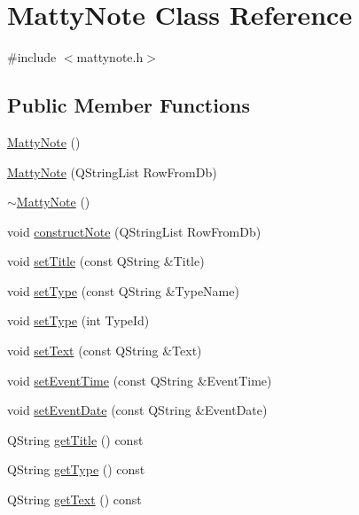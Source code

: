 \hypertarget{classMattyNote}{}\section{Matty\+Note Class Reference}
\label{classMattyNote}


{\ttfamily \#include $<$mattynote.\+h$>$}

\subsection*{Public Member Functions}
\begin{DoxyCompactItemize}
\item 
\hyperlink{classMattyNote_a8c09bf366e6973bc1c4f4d5daa792899}{Matty\+Note} ()
\item 
\hyperlink{classMattyNote_a101e9c2475ee2567dfa2e168b543806f}{Matty\+Note} (Q\+String\+List Row\+From\+Db)
\item 
\hyperlink{classMattyNote_a2831641523b4a0d5c36100689f95c912}{$\sim$\+Matty\+Note} ()
\item 
void \hyperlink{classMattyNote_a180cda16bc8c77964169edb90468c151}{construct\+Note} (Q\+String\+List Row\+From\+Db)
\item 
void \hyperlink{classMattyNote_af7909f64608b020b501019cf29796eb0}{set\+Title} (const Q\+String \&Title)
\item 
void \hyperlink{classMattyNote_ac9171fd4faaf0c286c9315a0b4ef4560}{set\+Type} (const Q\+String \&Type\+Name)
\item 
void \hyperlink{classMattyNote_a8ae86d728b9cb64fa78042a09cb5aa70}{set\+Type} (int Type\+Id)
\item 
void \hyperlink{classMattyNote_afa0c4ee32401e4a09e8d04fd0b01da0b}{set\+Text} (const Q\+String \&Text)
\item 
void \hyperlink{classMattyNote_aaeba8670420ab9ad0fb8be660845e0ba}{set\+Event\+Time} (const Q\+String \&Event\+Time)
\item 
void \hyperlink{classMattyNote_a70676b1ab215b873c9451a82cc417684}{set\+Event\+Date} (const Q\+String \&Event\+Date)
\item 
Q\+String \hyperlink{classMattyNote_a2205505ded709f404d995884a8d34c4a}{get\+Title} () const
\item 
Q\+String \hyperlink{classMattyNote_a882bd562d91b1d63ef6c982294b961d7}{get\+Type} () const
\item 
Q\+String \hyperlink{classMattyNote_abced4f72489e13f7a06c70e473858cdc}{get\+Text} () const
\item 

\end{DoxyCompactItemize}
